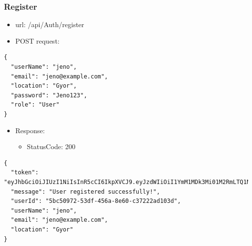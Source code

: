 \documentclass[11pt]{article}
\begin{document}
\subsubsection{Register}
\label{sec:orgeac752b}
\begin{itemize}
\item url: /api/Auth/register
\item POST request:
\end{itemize}
\begin{verbatim}
{
  "userName": "jeno",
  "email": "jeno@example.com",
  "location": "Gyor",
  "password": "Jeno123",
  "role": "User"
}
\end{verbatim}
\begin{itemize}
\item Response:
\begin{itemize}
\item StatusCode: 200
\end{itemize}
\end{itemize}
\begin{verbatim}
{
  "token": "eyJhbGciOiJIUzI1NiIsInR5cCI6IkpXVCJ9.eyJzdWIiOiI1YmM1MDk3Mi01M2RmLTQ1NmEtOGU2MC1jMzcyMjJhZDEwM2QiLCJlbWFpbCI6Implbm9AZXhhbXBsZS5jb20iLCJ1bmlxdWVfbmFtZSI6Implbm8iLCJsb2NhdGlvbiI6Ikd5b3IiLCJodHRwOi8vc2NoZW1hcy5taWNyb3NvZnQuY29tL3dzLzIwMDgvMDYvaWRlbnRpdHkvY2xhaW1zL3JvbGUiOiJVc2VyIiwiZXhwIjoxNzQ1OTE3MjUyLCJpc3MiOiJodHRwczovL3VuaXBvaW50LWI2aDZoNGN1Ym5jbWFmaGgucG9sYW5kY2VudHJhbC0wMS5henVyZXdlYnNpdGVzLm5ldCIsImF1ZCI6Imh0dHBzOi8vdW5pcG9pbnQtYjZoNmg0Y3VibmNtYWZoaC5wb2xhbmRjZW50cmFsLTAxLmF6dXJld2Vic2l0ZXMubmV0In0.pSL_OrSHcPK8fZqlmHTtLBclXwlL4o7wyKBwgEkjIho",
  "message": "User registered successfully!",
  "userId": "5bc50972-53df-456a-8e60-c37222ad103d",
  "userName": "jeno",
  "email": "jeno@example.com",
  "location": "Gyor"
}
\end{verbatim}
\end{document}
